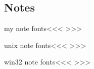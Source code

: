 \documentclass{article}
\begin{document}
\subsection{Notes}

\<my note fonts\><<<
>>>

\<unix note fonts\><<<
>>>


\<win32 note fonts\><<<
>>>
\end{document}
